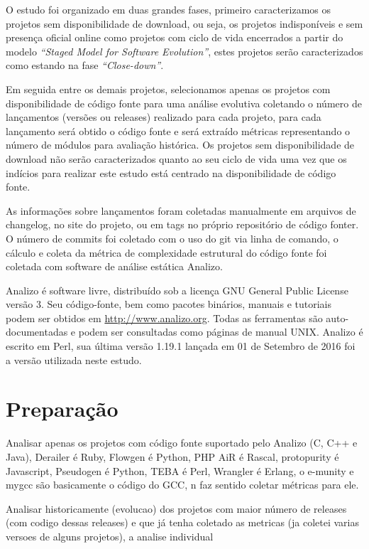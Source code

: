 O estudo foi organizado em duas grandes fases, primeiro caracterizamos os
projetos sem disponibilidade de download, ou seja, os projetos indisponíveis e
sem presença oficial online como projetos com ciclo de vida encerrados a partir
do modelo {\it ``Staged Model for Software Evolution''}, estes projetos serão
caracterizados como estando na fase {\it ``Close-down''}.

Em seguida entre os demais projetos, selecionamos apenas os projetos com
disponibilidade de código fonte para uma análise evolutiva coletando o número
de lançamentos (versões ou releases) realizado para cada projeto, para cada
lançamento será obtido o código fonte e será extraído métricas representando o
número de módulos para avaliação histórica. Os projetos sem disponibilidade de
download não serão caracterizados quanto ao seu ciclo de vida uma vez que os
indícios para realizar este estudo está centrado na disponibilidade de código
fonte.

As informações sobre lançamentos foram coletadas manualmente em arquivos de
changelog, no site do projeto, ou em tags no próprio repositório de código
fonter. O número de commits foi coletado com o uso do git via linha de comando,
o cálculo e coleta da métrica de complexidade estrutural do código fonte foi
coletada com software de análise estática Analizo.

Analizo é software livre, distribuído sob a licença GNU General Public License
versão 3. Seu código-fonte, bem como pacotes binários, manuais e tutoriais
podem ser obtidos em \url{http://www.analizo.org}. Todas as ferramentas são
auto-documentadas e podem ser consultadas como páginas de manual UNIX. 
Analizo é escrito em Perl, sua última versão 1.19.1 lançada em 01 de Setembro de 2016
foi a versão utilizada neste estudo.

\section{Preparação} \label{estudo3:preparacao}

Analisar apenas os projetos com código fonte suportado pelo Analizo (C, C++ e Java),
Derailer é Ruby, Flowgen é Python, PHP AiR é Rascal, protopurity é Javascript,
Pseudogen é Python, TEBA é Perl, Wrangler é Erlang,
o e-munity e mygcc são basicamente o código do GCC, n faz sentido coletar métricas para ele.

Analisar historicamente (evolucao) dos projetos com maior número de releases (com codigo dessas releases)
e que já tenha coletado as metricas (ja coletei varias versoes de alguns projetos), a analise
individual

